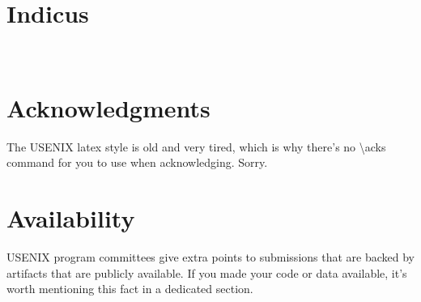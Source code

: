 \documentclass[letterpaper,twocolumn,10pt]{article}
\begin{document}
\section{Indicus}
\\


%




%















\section*{Acknowledgments}

The USENIX latex style is old and very tired, which is why
there's no \textbackslash{}acks command for you to use when
acknowledging. Sorry.

\section*{Availability}

USENIX program committees give extra points to submissions that are
backed by artifacts that are publicly available. If you made your code
or data available, it's worth mentioning this fact in a dedicated
section.


%


\end{document}
